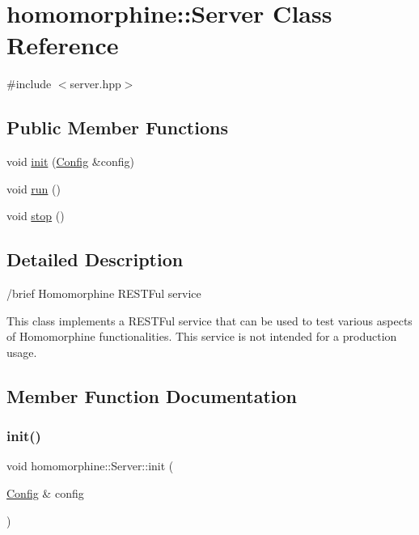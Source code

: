\hypertarget{classhomomorphine_1_1_server}{}\section{homomorphine\+::Server Class Reference}
\label{classhomomorphine_1_1_server}


{\ttfamily \#include $<$server.\+hpp$>$}

\subsection*{Public Member Functions}
\begin{DoxyCompactItemize}
\item 
void \mbox{\hyperlink{classhomomorphine_1_1_server_a0fcfa773dc495f0741387cdb11f95ea0}{init}} (\mbox{\hyperlink{classhomomorphine_1_1_config}{Config}} \&config)
\item 
void \mbox{\hyperlink{classhomomorphine_1_1_server_a02ae1a9f2334652a64a498e6a6efc4b1}{run}} ()
\item 
void \mbox{\hyperlink{classhomomorphine_1_1_server_a5655dfcc0a213e6bf1f8d35dbadebf4d}{stop}} ()
\end{DoxyCompactItemize}


\subsection{Detailed Description}
/brief Homomorphine R\+E\+S\+T\+Ful service

This class implements a R\+E\+S\+T\+Ful service that can be used to test various aspects of Homomorphine functionalities. This service is not intended for a production usage. 

\subsection{Member Function Documentation}
\mbox{\label{classhomomorphine_1_1_server_a0fcfa773dc495f0741387cdb11f95ea0}} 
\subsubsection{\texorpdfstring{init()}{init()}}
{\footnotesize\ttfamily void homomorphine\+::\+Server\+::init (\begin{DoxyParamCaption}\item[{\mbox{\hyperlink{classhomomorphine_1_1_config}{Config}} \&}]{config }\end{DoxyParamCaption})}

